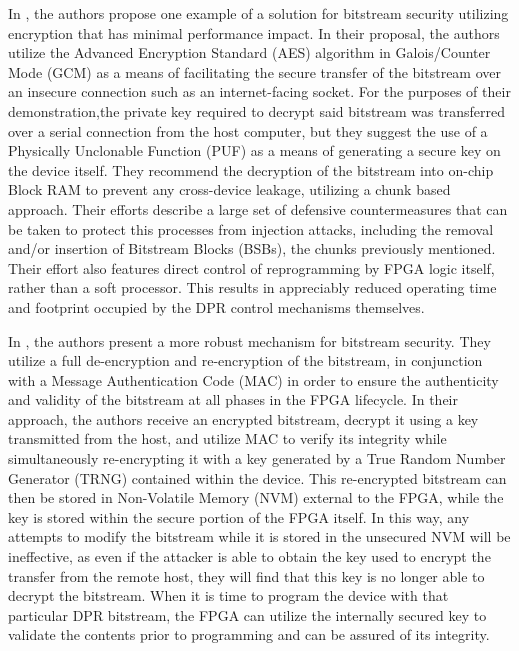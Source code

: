 In \cite{hori_bitstream_2013}, the authors propose one example of a solution for bitstream security utilizing encryption that has minimal performance impact. In their proposal, the authors utilize the Advanced Encryption Standard (AES) algorithm in Galois/Counter Mode (GCM) as a means of facilitating the secure transfer of the bitstream over an insecure connection such as an internet-facing socket. For the purposes of their demonstration,the private key required to decrypt said bitstream was transferred over a serial connection from the host computer, but they suggest the use of a Physically Unclonable Function (PUF) as a means of generating a secure key on the device itself. They recommend the decryption of the bitstream into on-chip Block RAM to prevent any cross-device leakage, utilizing a chunk based approach. Their efforts describe a large set of defensive countermeasures that can be taken to protect this processes from injection attacks, including the removal and/or insertion of Bitstream Blocks (BSBs), the chunks previously mentioned. Their effort also features direct control of reprogramming by FPGA logic itself, rather than a soft processor. This results in appreciably reduced operating time and footprint occupied by the DPR control mechanisms themselves.

In \cite{kashyap_compact_2016}, the authors present a more robust mechanism for bitstream security. They utilize a full de-encryption and re-encryption of the bitstream, in conjunction with a Message Authentication Code (MAC) in order to ensure the authenticity and validity of the bitstream at all phases in the FPGA lifecycle. In their approach, the authors receive an encrypted bitstream, decrypt it using a key transmitted from the host, and utilize MAC to verify its integrity while simultaneously re-encrypting it with a key generated by a True Random Number Generator (TRNG) contained within the device. This re-encrypted bitstream can then be stored in Non-Volatile Memory (NVM) external to the FPGA, while the key is stored within the secure portion of the FPGA itself. In this way, any attempts to modify the bitstream while it is stored in the unsecured NVM will be ineffective, as even if the attacker is able to obtain the key used to encrypt the transfer from the remote host, they will find that this key is no longer able to decrypt the bitstream. When it is time to program the device with that particular DPR bitstream, the FPGA can utilize the internally secured key to validate the contents prior to programming and can be assured of its integrity.

